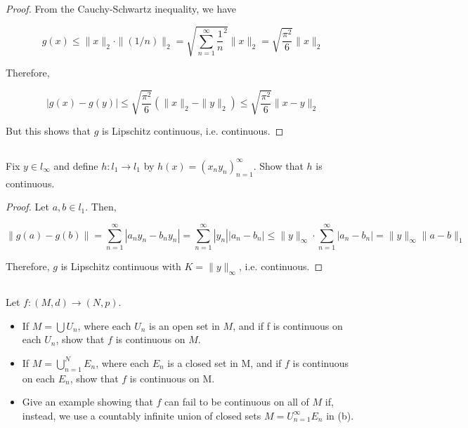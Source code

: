 \begin{proof}

From the Cauchy-Schwartz inequality, we have

$$g(x) \leq \|x\|_2 \cdot \|(1/n)\|_2 = \sqrt{\sum_{n=1}^\infty \frac{1}{n}^2} \|x\|_2= \sqrt{\frac{\pi^2}{6}} \|x\|_2$$


Therefore,

$$|g(x) - g(y)| \leq \sqrt{\frac{\pi^2}{6}} (\|x\|_2 - \|y\|_2) \leq \sqrt{\frac{\pi^2}{6}} \|x - y\|_2$$

But this shows that $g$ is Lipschitz continuous, i.e. continuous.

\end{proof}

\vspace{10em}


\subsection{} Fix  $y \in l_\infty$ and define $h: l_1 \rightarrow l_1$ by $h(x) = (x_n y_n )_{n=1}^\infty$. Show that $h$ is continuous.

\begin{proof}
Let $a,b \in l_1$. Then,

$$\|g(a) - g(b)\| = \sum_{n=1}^\infty |a_ny_n-b_ny_n| = \sum_{n=1}^\infty |y_n| |a_n-b_n| \leq \|y\|_\infty \cdot \sum_{n=1}^\infty |a_n-b_n| = \|y\|_\infty \|a-b\|_1$$

Therefore, $g$ is Lipschitz continuous with $K=\|y\|_\infty$, i.e. continuous.


\end{proof}


\subsection{} Let $f: (M, d) \rightarrow (N, p )$. 

\begin{itemize}
    \item If $M = \bigcup U_n$, where each $U_n$ is an open set in $M$, and if f is continuous on each $U_n$, show that $f$ is continuous on $M$. 
    \item If $M = \bigcup_{n=1}^N E_n$, where each $E_n$ is a closed set in M, and if $f$ is continuous on each $E_n$,  show that $f$ is continuous on M. 
    \item Give an example showing that $f$ can fail to be continuous on all of $M$ if, instead, we use a countably infinite union of closed sets $M = U_{n=1}^\infty E_n$ in (b). 
\end{itemize}

